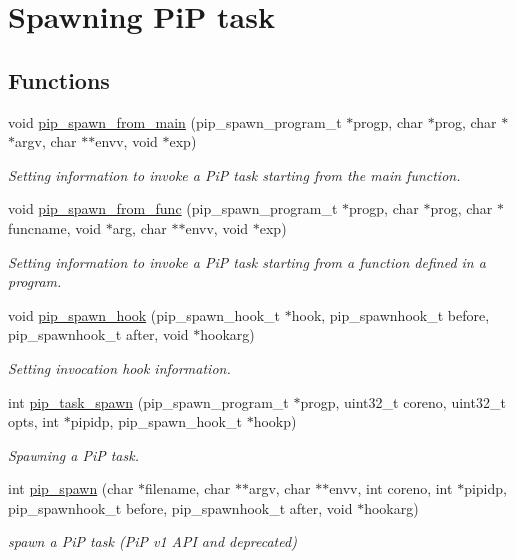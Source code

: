 \hypertarget{group__pip-1-spawn}{\section{Spawning Pi\-P task}
\label{group__pip-1-spawn}
}
\subsection*{Functions}
\begin{DoxyCompactItemize}
\item 
void \hyperlink{group__pip-1-spawn_ga0b1e746befd27c418355d28a830b2db6}{pip\-\_\-spawn\-\_\-from\-\_\-main} (pip\-\_\-spawn\-\_\-program\-\_\-t $\ast$progp, char $\ast$prog, char $\ast$$\ast$argv, char $\ast$$\ast$envv, void $\ast$exp)
\begin{DoxyCompactList}\small\item\em Setting information to invoke a Pi\-P task starting from the main function. \end{DoxyCompactList}\item 
void \hyperlink{group__pip-1-spawn_ga6ebadd5070ca345daf8d7465f4926fc0}{pip\-\_\-spawn\-\_\-from\-\_\-func} (pip\-\_\-spawn\-\_\-program\-\_\-t $\ast$progp, char $\ast$prog, char $\ast$funcname, void $\ast$arg, char $\ast$$\ast$envv, void $\ast$exp)
\begin{DoxyCompactList}\small\item\em Setting information to invoke a Pi\-P task starting from a function defined in a program. \end{DoxyCompactList}\item 
void \hyperlink{group__pip-1-spawn_ga1c3f1d9e029f68dbcfb7d78b7dfa1533}{pip\-\_\-spawn\-\_\-hook} (pip\-\_\-spawn\-\_\-hook\-\_\-t $\ast$hook, pip\-\_\-spawnhook\-\_\-t before, pip\-\_\-spawnhook\-\_\-t after, void $\ast$hookarg)
\begin{DoxyCompactList}\small\item\em Setting invocation hook information. \end{DoxyCompactList}\item 
int \hyperlink{group__pip-1-spawn_gaf1fcc4cb85ec3eda734afe2beb0c6a36}{pip\-\_\-task\-\_\-spawn} (pip\-\_\-spawn\-\_\-program\-\_\-t $\ast$progp, uint32\-\_\-t coreno, uint32\-\_\-t opts, int $\ast$pipidp, pip\-\_\-spawn\-\_\-hook\-\_\-t $\ast$hookp)
\begin{DoxyCompactList}\small\item\em Spawning a Pi\-P task. \end{DoxyCompactList}\item 
int \hyperlink{group__pip-1-spawn_gae9187ea22ecf0623fa3ecfba5337f52d}{pip\-\_\-spawn} (char $\ast$filename, char $\ast$$\ast$argv, char $\ast$$\ast$envv, int coreno, int $\ast$pipidp, pip\-\_\-spawnhook\-\_\-t before, pip\-\_\-spawnhook\-\_\-t after, void $\ast$hookarg)
\begin{DoxyCompactList}\small\item\em spawn a Pi\-P task (Pi\-P v1 A\-P\-I and deprecated) \end{DoxyCompactList}\end{DoxyCompactItemize}


